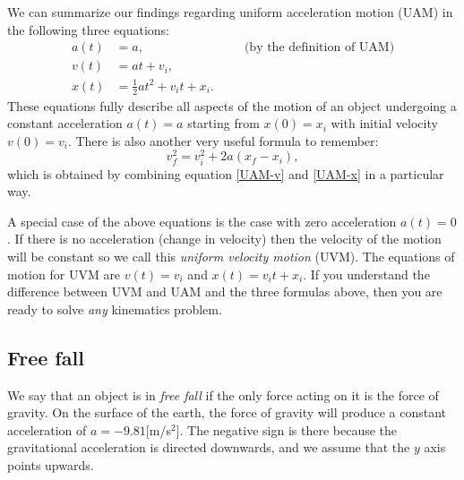 \documentclass[letterpaper,9pt,journal]{IEEEtran}
\newcommand{\be}{\begin{equation}}
\newcommand{\ee}{\end{equation}}
\begin{document}





We can summarize our findings regarding uniform acceleration motion (UAM)
in the following three equations: 
\begin{align}
  a(t) &= a, \qquad \qquad \qquad \qquad  \text{(by the definition of UAM)} \nonumber \\
  v(t) &= at + v_i, 				  \label{UAM-v} \\
  x(t) &= \tfrac{1}{2}at^2 +  v_i t + x_i. \label{UAM-x}
\end{align}
These equations fully describe all aspects of the motion of an object undergoing a 
constant acceleration $a(t)=a$ starting from $x(0)=x_i$ with initial velocity $v(0)=v_i$.
%
There is also another very useful formula to remember:
\be
 v_f^2 = v_i^2 + 2a(x_f-x_i), %
\ee
which is obtained by combining equation \eqref{UAM-v} and \eqref{UAM-x} in a particular way.

A special case of the above equations is the case with zero acceleration $a(t)=0$.
If there is no acceleration (change in velocity) then the velocity of the motion will be
constant so we call this \emph{uniform velocity motion} (UVM). 
The equations of motion for UVM are $v(t)=v_i$ and $x(t)=v_it + x_i$.
If you understand the difference between UVM and UAM and the three formulas above,
then you are ready to solve \emph{any} kinematics problem. %

\vspace{-3mm}
\subsection{Free fall}

We say that an object is in \emph{free fall} if the only force acting on it is the force of gravity.
On the surface of the earth, the force of gravity will produce a constant acceleration
of $a=-9.81$[m/s$^2$]. The negative sign is there because the gravitational acceleration
is directed downwards, and we assume that the $y$ axis points upwards.
\end{document}
